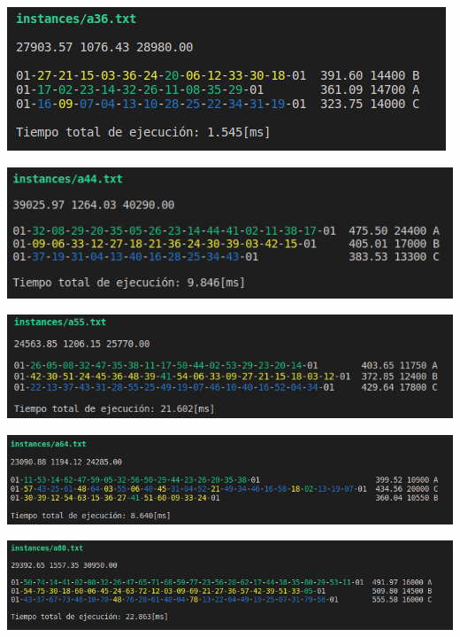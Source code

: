 \begin{center}
    \includegraphics[width=\columnwidth]{imagenes/a36}
\end{center}
\begin{center}
    \includegraphics[width=\columnwidth]{imagenes/a44}
\end{center}
\begin{center}
    \includegraphics[width=\columnwidth]{imagenes/a55}
\end{center}
\begin{center}
    \includegraphics[width=\columnwidth]{imagenes/a64}
\end{center}
\begin{center}
    \includegraphics[width=\columnwidth]{imagenes/a80}
\end{center}
